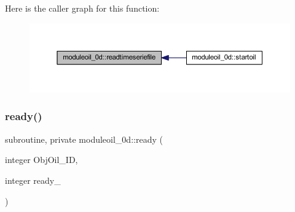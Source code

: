 Here is the caller graph for this function\+:\nopagebreak
\begin{figure}[H]
\begin{center}
\leavevmode
\includegraphics[width=350pt]{namespacemoduleoil__0d_a3c2fbab1e96896178c05bcf889f853fc_icgraph}
\end{center}
\end{figure}
\mbox{\label{namespacemoduleoil__0d_a5cfb3f6c158c2f89ed12f50f11b66786}} 
\subsubsection{\texorpdfstring{ready()}{ready()}}
{\footnotesize\ttfamily subroutine, private moduleoil\+\_\+0d\+::ready (\begin{DoxyParamCaption}\item[{integer}]{Obj\+Oil\+\_\+\+ID,  }\item[{integer}]{ready\+\_\+ }\end{DoxyParamCaption})\hspace{0.3cm}{\ttfamily [private]}}

